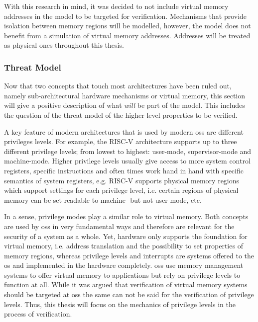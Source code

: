 With this research in mind, it was decided to not include virtual memory addresses in the model to be targeted for verification.
Mechanisms that provide isolation between memory regions will be modelled, however, the model does not benefit from a simulation of virtual memory addresses.
Addresses will be treated as physical ones throughout this thesis.

\subsubsection{Threat Model}
\label{sec:threat-model}


Now that two concepts that touch most architectures have been ruled out, namely sub-architectural hardware mechanisms or virtual memory, this section will give a positive description of what \textit{will} be part of the model.
This includes the question of the threat model of the higher level properties to be verified.

A key feature of modern architectures that is used by modern \glspl{os} are different privileges levels.
For example, the RISC-V architecture supports up to three different privilege levels; from lowest to highest: user-mode, supervisor-mode and machine-mode.
Higher privilege levels usually give access to more system control registers, specific instructions and often times work hand in hand with specific semantics of system registers, e.g. RISC-V supports physical memory regions which support settings for each privilege level, i.e. certain regions of physical memory can be set readable to machine- but not user-mode, etc.

In a sense, privilege modes play a similar role to virtual memory.
Both concepts are used by \glspl{os} in very fundamental ways and therefore are relevant for the security of a system as a whole.
Yet, hardware only supports the foundation for virtual memory, i.e. address translation and the possibility to set properties of memory regions, whereas privilege levels and interrupts are systems offered to the \gls{os} and implemented in the hardware completely.
\glspl{os} use memory management systems to offer virtual memory to applications but rely on privilege levels to function at all.
While it was argued that verification of virtual memory systems should be targeted at \glspl{os} the same can not be said for the verification of privilege levels.
Thus, this thesis will focus on the mechanics of privilege levels in the process of verification.

